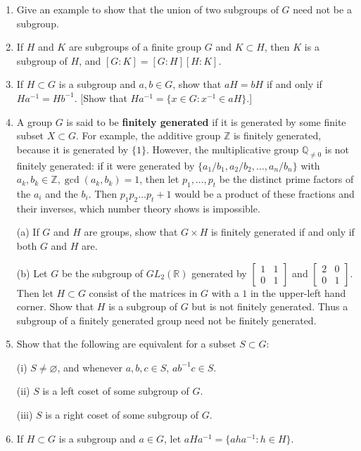 \documentclass[leqno]{book}
\begin{document}
\begin{enumerate}
\item Give an example to show that the union of two subgroups of $G$ need not be a subgroup.

\item If $H$ and $K$ are subgroups of a finite group $G$ and $K\subset H$, then $K$ is a subgroup of $H$, and $[G:K]=[G:H][H:K]$.

\item If $H\subset G$ is a subgroup and $a,b\in G$, show that $aH=bH$ if and only if $Ha^{-1}=Hb^{-1}$.  [Show that $Ha^{-1}=\{x\in G:x^{-1}\in aH\}$.]

\item A group $G$ is said to be \textbf{finitely generated} if it is generated by some finite subset $X\subset G$.  For example, the additive group $\mathbb Z$ is finitely generated, because it is generated by $\{1\}$.  However, the multiplicative group $\mathbb Q_{\ne 0}$ is not finitely generated: if it were generated by $\{a_1/b_1,a_2/b_2,\dots,a_n/b_n\}$ with $a_k,b_k\in\mathbb Z,\gcd(a_k,b_k)=1$, then let $p_1,\dots,p_t$ be the distinct prime factors of the $a_i$ and the $b_i$.  Then $p_1p_2\dots p_t+1$ would be a product of these fractions and their inverses, which number theory shows is impossible.

(a) If $G$ and $H$ are groups, show that $G\times H$ is finitely generated if and only if both $G$ and $H$ are.

(b) Let $G$ be the subgroup of $GL_2(\mathbb R)$ generated by $\begin{bmatrix}1&1\\0&1\end{bmatrix}$ and $\begin{bmatrix}2&0\\0&1\end{bmatrix}$.  Then let $H\subset G$ consist of the matrices in $G$ with a $1$ in the upper-left hand corner.  Show that $H$ is a subgroup of $G$ but is not finitely generated.  Thus a subgroup of a finitely generated group need not be finitely generated.

\item Show that the following are equivalent for a subset $S\subset G$:

(i) $S\ne\varnothing$, and whenever $a,b,c\in S$, $ab^{-1}c\in S$.

(ii) $S$ is a left coset of some subgroup of $G$.

(iii) $S$ is a right coset of some subgroup of $G$.

\item If $H\subset G$ is a subgroup and $a\in G$, let $aHa^{-1}=\{aha^{-1}:h\in H\}$.


\end{enumerate}
\end{document}
